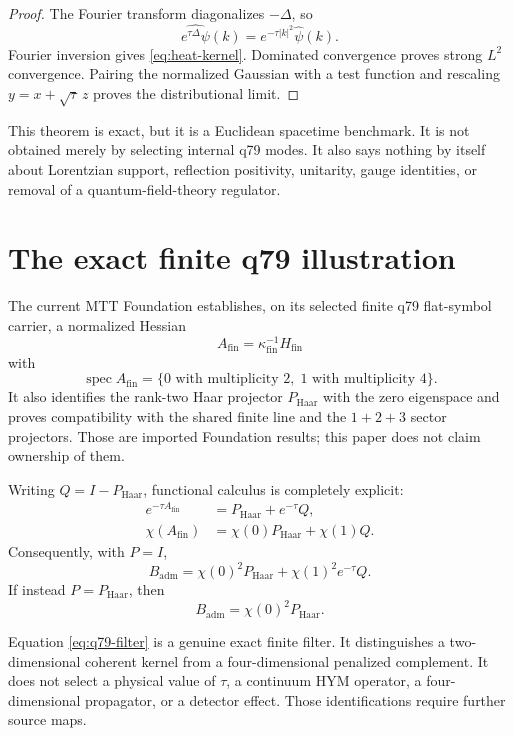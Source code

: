 \documentclass[11pt]{article}
\theoremstyle{definition}
\theoremstyle{remark}
\newcommand{\Badm}{B_{\mathrm{adm}}}
\newcommand{\spec}{\operatorname{spec}}
\newcommand{\Id}{I}
\begin{document}
\begin{proof}
The Fourier transform diagonalizes \(-\Delta\), so
\[
 \widehat{e^{\tau\Delta}\psi}(k)=e^{-\tau|k|^2}\widehat\psi(k).
\]
Fourier inversion gives \eqref{eq:heat-kernel}. Dominated convergence proves
strong \(L^2\) convergence. Pairing the normalized Gaussian with a test
function and rescaling \(y=x+\sqrt{\tau}\,z\) proves the distributional
limit.
\end{proof}

This theorem is exact, but it is a Euclidean spacetime benchmark. It is not
obtained merely by selecting internal q79 modes. It also says nothing by
itself about Lorentzian support, reflection positivity, unitarity, gauge
identities, or removal of a quantum-field-theory regulator.

\section{The exact finite q79 illustration}

The current MTT Foundation establishes, on its selected finite q79
flat-symbol carrier, a normalized Hessian
\[
 A_{\mathrm{fin}}=\kappa_{\mathrm{fin}}^{-1}H_{\mathrm{fin}}
\]
with
\[
 \spec A_{\mathrm{fin}}
 =\{0\text{ with multiplicity }2,\;
    1\text{ with multiplicity }4\}.
\]
It also identifies the rank-two Haar projector \(P_{\mathrm{Haar}}\) with
the zero eigenspace and proves compatibility with the shared finite line and
the \(1+2+3\) sector projectors. Those are imported Foundation results; this
paper does not claim ownership of them.

Writing \(Q=\Id-P_{\mathrm{Haar}}\), functional calculus is completely
explicit:
\begin{align}
 e^{-\tau A_{\mathrm{fin}}}
 &=P_{\mathrm{Haar}}+e^{-\tau}Q,\\
 \chi(A_{\mathrm{fin}})
 &=\chi(0)P_{\mathrm{Haar}}+\chi(1)Q.
\end{align}
Consequently, with \(P=\Id\),
\begin{equation}
 \Badm=
 \chi(0)^2P_{\mathrm{Haar}}
 +\chi(1)^2e^{-\tau}Q.
 \label{eq:q79-filter}
\end{equation}
If instead \(P=P_{\mathrm{Haar}}\), then
\[
 \Badm=\chi(0)^2P_{\mathrm{Haar}}.
\]

Equation \eqref{eq:q79-filter} is a genuine exact finite filter. It
distinguishes a two-dimensional coherent kernel from a four-dimensional
penalized complement. It does not select a physical value of \(\tau\), a
continuum HYM operator, a four-dimensional propagator, or a detector effect.
Those identifications require further source maps.
\end{document}
